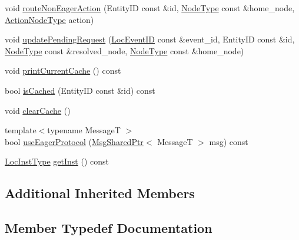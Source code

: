 \begin{DoxyCompactItemize}
\item 
void \hyperlink{structvt_1_1location_1_1_entity_location_coord_ae7c1ec3412f2a16ea3f40d6bb39f23ca}{route\+Non\+Eager\+Action} (Entity\+ID const \&id, \hyperlink{namespacevt_a866da9d0efc19c0a1ce79e9e492f47e2}{Node\+Type} const \&home\+\_\+node, \hyperlink{namespacevt_a0436cb2d620dcbb21b5b49cd9c9c4749}{Action\+Node\+Type} action)
\item 
void \hyperlink{structvt_1_1location_1_1_entity_location_coord_a96e4c5c2a943450554b17c34f05995d0}{update\+Pending\+Request} (\hyperlink{namespacevt_1_1location_aa5ccc1a42aa22b0b41fcfbbdee314dca}{Loc\+Event\+ID} const \&event\+\_\+id, Entity\+ID const \&id, \hyperlink{namespacevt_a866da9d0efc19c0a1ce79e9e492f47e2}{Node\+Type} const \&resolved\+\_\+node, \hyperlink{namespacevt_a866da9d0efc19c0a1ce79e9e492f47e2}{Node\+Type} const \&home\+\_\+node)
\item 
void \hyperlink{structvt_1_1location_1_1_entity_location_coord_a33f2bf9523cfc89fae0f1151fa2d87db}{print\+Current\+Cache} () const
\item 
bool \hyperlink{structvt_1_1location_1_1_entity_location_coord_a9e6d5b9783f617f4e036ad9f7ba19953}{is\+Cached} (Entity\+ID const \&id) const
\item 
void \hyperlink{structvt_1_1location_1_1_entity_location_coord_ac20c510b73a5f6f753269b6d05b389aa}{clear\+Cache} ()
\item 
{\footnotesize template$<$typename MessageT $>$ }\\bool \hyperlink{structvt_1_1location_1_1_entity_location_coord_a5d41b90c998e6de566868868c9cc4ba1}{use\+Eager\+Protocol} (\hyperlink{namespacevt_ab2b3d506ec8e8d1540aede826d84a239}{Msg\+Shared\+Ptr}$<$ MessageT $>$ msg) const
\item 
\hyperlink{namespacevt_1_1location_a4db6456e8024af2d23fc5ae560fef866}{Loc\+Inst\+Type} \hyperlink{structvt_1_1location_1_1_entity_location_coord_abff79ccad9dcd168217f99ee97048beb}{get\+Inst} () const
\end{DoxyCompactItemize}
\subsection*{Additional Inherited Members}


\subsection{Member Typedef Documentation}
\mbox{\label{structvt_1_1location_1_1_entity_location_coord_afeaaebfc1d7cbdd20cccbd348d96748a}} 
